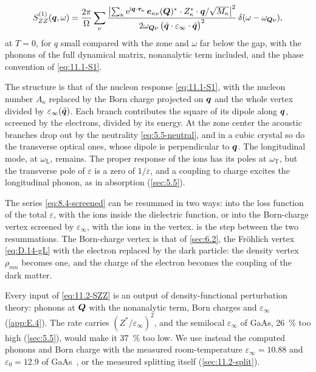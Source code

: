 \begin{keyresult}
\begin{equation}
  S^{(1)}_{ZZ}(\bm{q},\omega) = \frac{2\pi}{\Omega}\sum_\nu\frac{\bigl|\sum_\kappa\mathrm{e}^{\mathrm{i}\bm{q}\cdot\bm{\tau}_\kappa}\,\bm{e}_{\kappa\nu}(\bm{Q})^*\cdot Z^*_\kappa\cdot\bm{q}/\sqrt{M_\kappa}\bigr|^2}{2\omega_{\bm{Q}\nu}\,\bigl(\hat{\bm{q}}\cdot\varepsilon_\infty\cdot\hat{\bm{q}}\bigr)^2}\,\delta(\omega - \omega_{\bm{Q}\nu}) ,
  \label{eq:11.2-SZZ}
\end{equation}
at $T = 0$, for $q$ small compared with the zone and $\omega$ far below the gap, with the phonons of the full dynamical matrix, nonanalytic term included, and the phase convention of \cref{eq:11.1-S1}.
\end{keyresult}
\noindent The structure is that of the nucleon response \cref{eq:11.1-S1}, with the nucleon number $A_\kappa$ replaced by the Born charge projected on $\bm{q}$ and the whole vertex divided by $\varepsilon_\infty(\hat{\bm{q}})$. Each branch contributes the square of its dipole along $\bm{q}$, screened by the electrons, divided by its energy. At the zone center the acoustic branches drop out by the neutrality \cref{eq:5.5-neutral}, and in a cubic crystal so do the transverse optical ones, whose dipole is perpendicular to $\bm{q}$. The longitudinal mode, at $\omega_{\mathrm{L}}$, remains. The proper response of the ions has its poles at $\omega_{\mathrm{T}}$, but the transverse pole of $\varepsilon$ is a zero of $1/\varepsilon$, and a coupling to charge excites the longitudinal phonon, as in absorption (\cref{sec:5.5}).

The series \cref{eq:8.4-screened} can be resummed in two ways: into the loss function of the total $\varepsilon$, with the ions inside the dielectric function, or into the Born-charge vertex screened by $\varepsilon_\infty$, with the ions in the vertex.  is the step between the two resummations. The Born-charge vertex is that of \cref{sec:6.2}, the Fr\"ohlich vertex \cref{eq:D.14-gL} with the electron replaced by the dark particle: the density vertex $\rho_{mn}$ becomes one, and the charge of the electron becomes the coupling of the dark matter.

Every input of \cref{eq:11.2-SZZ} is an output of density-functional perturbation theory: phonons at $\bm{Q}$ with the nonanalytic term, Born charges and $\varepsilon_\infty$ (\cref{app:E.4}). The rate carries $(Z^*/\varepsilon_\infty)^2$, and the semilocal $\varepsilon_\infty$ of GaAs, \SI{26}{\percent} too high (\cref{sec:5.5}), would make it \SI{37}{\percent} too low. We use instead the computed phonons and Born charge with the measured room-temperature $\varepsilon_\infty = 10.88$ and $\varepsilon_0 = 12.9$ of GaAs~\cite{lockwood2005optical}, or the measured splitting itself (\cref{sec:11.2-split}).

